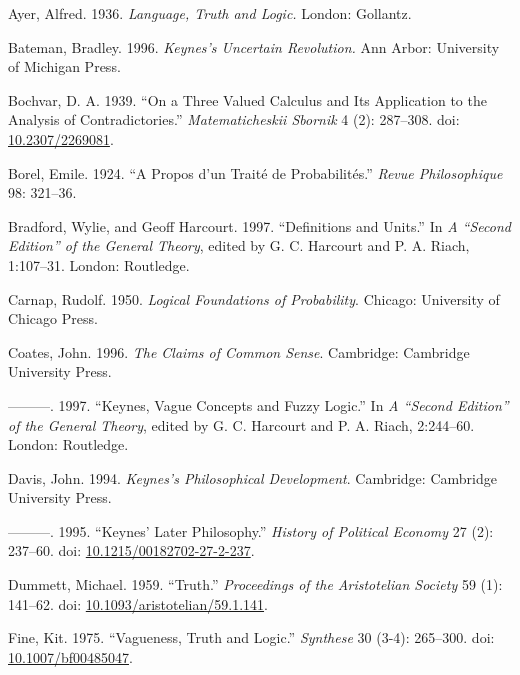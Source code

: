 \documentclass[
  10pt,
  letterpaper,
  DIV=11,
  numbers=noendperiod,
  twoside]{scrartcl}
\newlength{\cslhangindent}
\newenvironment{CSLReferences}[2] %
 {\begin{list}{}{%
  \setlength{\itemindent}{0pt}
  \setlength{\leftmargin}{0pt}
  \setlength{\parsep}{0pt}
  \ifodd #1
   \setlength{\leftmargin}{\cslhangindent}
   \setlength{\itemindent}{-1\cslhangindent}
  \fi
  \setlength{\itemsep}{#2\baselineskip}}}
 {\end{list}}
\begin{document}
\label{refs}
\begin{CSLReferences}{1}{0}
Ayer, Alfred. 1936. \emph{Language, Truth and Logic.} London: Gollantz.

Bateman, Bradley. 1996. \emph{Keynes's Uncertain Revolution.} Ann Arbor:
University of Michigan Press.

Bochvar, D. A. 1939. {``On a Three Valued Calculus and Its Application
to the Analysis of Contradictories.''} \emph{Matematicheskii Sbornik} 4
(2): 287--308. doi:
\href{https://doi.org/10.2307/2269081}{10.2307/2269081}.

Borel, Emile. 1924. {``A Propos d'un Trait{é} de Probabilit{é}s.''}
\emph{Revue Philosophique} 98: 321--36.

Bradford, Wylie, and Geoff Harcourt. 1997. {``Definitions and Units.''}
In \emph{A {``Second Edition''} of the General Theory}, edited by G. C.
Harcourt and P. A. Riach, 1:107--31. London: Routledge.

Carnap, Rudolf. 1950. \emph{Logical Foundations of Probability}.
Chicago: University of Chicago Press.

Coates, John. 1996. \emph{The Claims of Common Sense}. Cambridge:
Cambridge University Press.

---------. 1997. {``Keynes, Vague Concepts and Fuzzy Logic.''} In
\emph{A {``Second Edition''} of the General Theory}, edited by G. C.
Harcourt and P. A. Riach, 2:244--60. London: Routledge.

Davis, John. 1994. \emph{Keynes's Philosophical Development}. Cambridge:
Cambridge University Press.

---------. 1995. {``Keynes' Later Philosophy.''} \emph{History of
Political Economy} 27 (2): 237--60. doi:
\href{https://doi.org/10.1215/00182702-27-2-237}{10.1215/00182702-27-2-237}.

Dummett, Michael. 1959. {``Truth.''} \emph{Proceedings of the
Aristotelian Society} 59 (1): 141--62. doi:
\href{https://doi.org/10.1093/aristotelian/59.1.141}{10.1093/aristotelian/59.1.141}.

Fine, Kit. 1975. {``Vagueness, Truth and Logic.''} \emph{Synthese} 30
(3-4): 265--300. doi:
\href{https://doi.org/10.1007/bf00485047}{10.1007/bf00485047}.


\end{CSLReferences}
\end{document}
